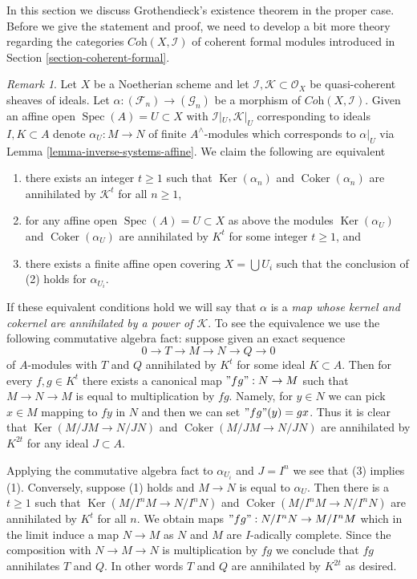 \documentclass{stacks-project}
\theoremstyle{plain}
\theoremstyle{definition}
\theoremstyle{remark}
\newtheorem{remark}[subsection]{Remark}
\numberwithin{equation}{subsection}
\def\Spec{\mathop{\mathrm{Spec}}}
\def\Ker{\mathop{\mathrm{Ker}}}
\def\Coker{\mathop{\mathrm{Coker}}}
\begin{document}
\noindent
In this section we discuss Grothendieck's existence theorem in the proper case.
Before we give the statement and proof, we need to develop a bit
more theory regarding the categories $\textit{Coh}(X, \mathcal{I})$
of coherent formal modules
introduced in Section \ref{section-coherent-formal}.

\begin{remark}
\label{remark-inverse-systems-kernel-cokernel-annihilated-by}
Let $X$ be a Noetherian scheme and let
$\mathcal{I}, \mathcal{K} \subset \mathcal{O}_X$
be quasi-coherent sheaves of ideals. Let
$\alpha : (\mathcal{F}_n) \to (\mathcal{G}_n)$ be a morphism of
$\textit{Coh}(X, \mathcal{I})$.
Given an affine open $\Spec(A) = U \subset X$ with
$\mathcal{I}|_U, \mathcal{K}|_U$ corresponding to ideals $I, K \subset A$
denote $\alpha_U : M \to N$ of finite $A^\wedge$-modules which
corresponds to $\alpha|_U$ via Lemma \ref{lemma-inverse-systems-affine}.
We claim the following are equivalent
\begin{enumerate}
\item there exists an integer $t \geq 1$ such that
$\Ker(\alpha_n)$ and $\Coker(\alpha_n)$
are annihilated by $\mathcal{K}^t$ for all $n \geq 1$,
\item for any affine open $\Spec(A) = U \subset X$ as above
the modules $\Ker(\alpha_U)$ and $\Coker(\alpha_U)$
are annihilated by $K^t$ for some integer $t \geq 1$, and
\item there exists a finite affine open covering $X = \bigcup U_i$
such that the conclusion of (2) holds for $\alpha_{U_i}$.
\end{enumerate}
If these equivalent conditions hold we will say that
$\alpha$ is a
{\it map whose kernel and cokernel are annihilated by a power of
$\mathcal{K}$}.
To see the equivalence we use the following commutative algebra fact:
suppose given an exact sequence
$$
0 \to T \to M \to N \to Q \to 0
$$
of $A$-modules with $T$ and $Q$ annihilated by $K^t$ for some
ideal $K \subset A$. Then for every $f, g \in K^t$ there exists a
canonical map $"fg": N \to M$ such that $M \to N \to M$ is equal to
multiplication by $fg$. Namely, for $y \in N$ we can pick $x \in M$
mapping to $fy$ in $N$ and then we can set $"fg"(y) = gx$. Thus it is
clear that $\Ker(M/JM \to N/JN)$ and $\Coker(M/JM \to N/JN)$
are annihilated by $K^{2t}$ for any ideal $J \subset A$.

\medskip\noindent
Applying the commutative algebra fact to $\alpha_{U_i}$ and $J = I^n$
we see that (3) implies (1). Conversely,
suppose (1) holds and $M \to N$ is equal to $\alpha_U$. Then there is
a $t \geq 1$ such that
$\Ker(M/I^nM \to N/I^nN)$ and $\Coker(M/I^nM \to N/I^nN)$
are annihilated by $K^t$ for all $n$. We obtain maps
$"fg" : N/I^nN \to M/I^nM$ which in the limit induce a map $N \to M$
as $N$ and $M$ are $I$-adically complete. Since the composition with
$N \to M \to N$ is multiplication by $fg$ we conclude that $fg$
annihilates $T$ and $Q$. In other words $T$ and $Q$ are annihilated by
$K^{2t}$ as desired.
\end{remark}
\end{document}
